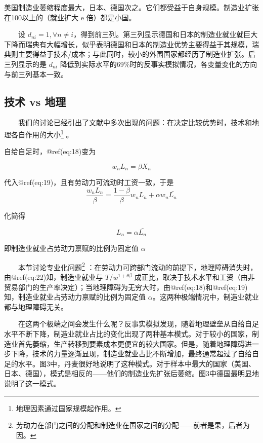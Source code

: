 \documentclass[]{tufte-handout}
\begin{document}
\begin{marginfigure}
美国制造业萎缩程度最大，日本、德国次之。它们都受益于自身规模。制造业扩张在100以上的（就业扩大
e 倍）都是小国。
\end{marginfigure}

　　设
\(d_{n i}=1, \forall n \neq i\)，得到前三列。第三列显示德国和日本的制造业就业就巨大下降而瑞典有大幅增长，似乎表明德国和日本的制造业优势主要得益于其规模，瑞典则主要得益于技术/成本；与此同时，较小的外围国家都经历了制造业扩张。后三列显示的是
\(d_{n i}\)
降低到实际水平的69\%时的反事实模拟情况，各变量变化的方向与前三列基本一致。

\hypertarget{ux6280ux672f-vs-ux5730ux7406}{%
\subsection{技术 vs 地理}\label{ux6280ux672f-vs-ux5730ux7406}}

　　我们的讨论已经引出了文献中多次出现的问题：在决定比较优势时，技术和地理各自作用的大小\footnote{地理因素通过国家规模起作用。}
。

\begin{marginfigure}
自给自足时，@ref(eq:18)变为

\[
w_n L_n = \beta X_n
\]

代入@ref(eq:19)，且有劳动力可流动时工资一致，于是 \[
\frac{w_n L_n}{\beta} = \frac{1-\beta}{\beta}w_n L_n+\alpha w_n \bar{L_n}
\]

化简得

\[
L_n = \alpha \bar{L_n}
\]

即制造业就业占劳动力禀赋的比例为固定值 \(\alpha\)
\end{marginfigure}

　　本节讨论专业化问题\footnote{劳动力在部门之间的分配和制造业在国家之间的分配------前者是果，后者为因。}
：在劳动力可跨部门流动的前提下，地理障碍消失时，由@ref(eq:22)知，制造业就业与
\(T/w^{1+\theta\beta}\)
成正比，取决于技术水平和工资（由非贸易部门的生产率决定）；当地理障碍为无穷大时，由@ref(eq:18)和@ref(eq:19)知，制造业就业占劳动力禀赋的比例为固定值
\(\alpha\)。这两种极端情况中，制造业就业都与地理障碍无关。

　　在这两个极端之间会发生什么呢？反事实模拟发现，随着地理壁垒从自给自足水平不断下降，制造业就业占比的变化出现了两种基本模式。对于较小的国家，制造业首先萎缩，生产转移到要素成本更便宜的较大国家。但是，随着地理障碍进一步下降，技术的力量逐渐显现，制造业就业占比不断增加，最终通常超过了自给自足的水平。图3中，丹麦很好地说明了这种模式。对于样本中最大的国家（美国、日本、德国），模式是相反的------他们的制造业先扩张后萎缩。图3中德国最明显地说明了这一模式。
\end{document}
